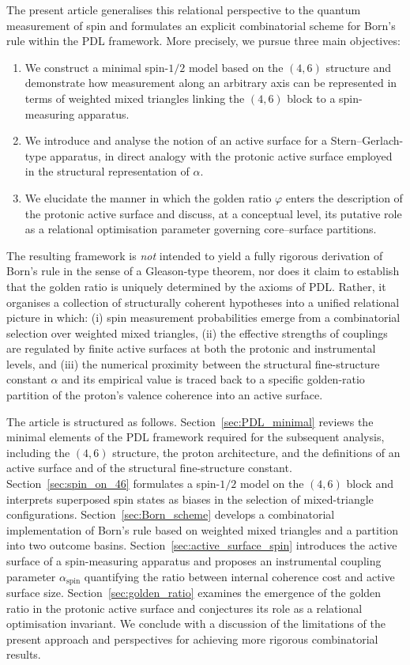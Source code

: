 \documentclass[11pt,a4paper]{article}
\numberwithin{equation}{section}
\begin{document}
The present article generalises this relational perspective to the quantum measurement of spin and formulates an explicit combinatorial scheme for Born’s rule within the PDL framework. More precisely, we pursue three main objectives:
\begin{enumerate}
  \item We construct a minimal spin-$1/2$ model based on the $(4,6)$ structure and demonstrate how measurement along an arbitrary axis can be represented in terms of weighted mixed triangles linking the $(4,6)$ block to a spin-measuring apparatus.
  \item We introduce and analyse the notion of an active surface for a Stern–Gerlach-type apparatus, in direct analogy with the protonic active surface employed in the structural representation of $\alpha$.
  \item We elucidate the manner in which the golden ratio $\varphi$ enters the description of the protonic active surface and discuss, at a conceptual level, its putative role as a relational optimisation parameter governing core–surface partitions.
\end{enumerate}

The resulting framework is \emph{not} intended to yield a fully rigorous derivation of Born’s rule in the sense of a Gleason-type theorem, nor does it claim to establish that the golden ratio is uniquely determined by the axioms of PDL. Rather, it organises a collection of structurally coherent hypotheses into a unified relational picture in which: (i) spin measurement probabilities emerge from a combinatorial selection over weighted mixed triangles, (ii) the effective strengths of couplings are regulated by finite active surfaces at both the protonic and instrumental levels, and (iii) the numerical proximity between the structural fine-structure constant $\alpha$ and its empirical value is traced back to a specific golden-ratio partition of the proton’s valence coherence into an active surface.

The article is structured as follows. Section~\ref{sec:PDL_minimal} reviews the minimal elements of the PDL framework required for the subsequent analysis, including the $(4,6)$ structure, the proton architecture, and the definitions of an active surface and of the structural fine-structure constant. Section~\ref{sec:spin_on_46} formulates a spin-$1/2$ model on the $(4,6)$ block and interprets superposed spin states as biases in the selection of mixed-triangle configurations. Section~\ref{sec:Born_scheme} develops a combinatorial implementation of Born’s rule based on weighted mixed triangles and a partition into two outcome basins. Section~\ref{sec:active_surface_spin} introduces the active surface of a spin-measuring apparatus and proposes an instrumental coupling parameter $\alpha_{\text{spin}}$ quantifying the ratio between internal coherence cost and active surface size. Section~\ref{sec:golden_ratio} examines the emergence of the golden ratio in the protonic active surface and conjectures its role as a relational optimisation invariant. We conclude with a discussion of the limitations of the present approach and perspectives for achieving more rigorous combinatorial results.
\end{document}
